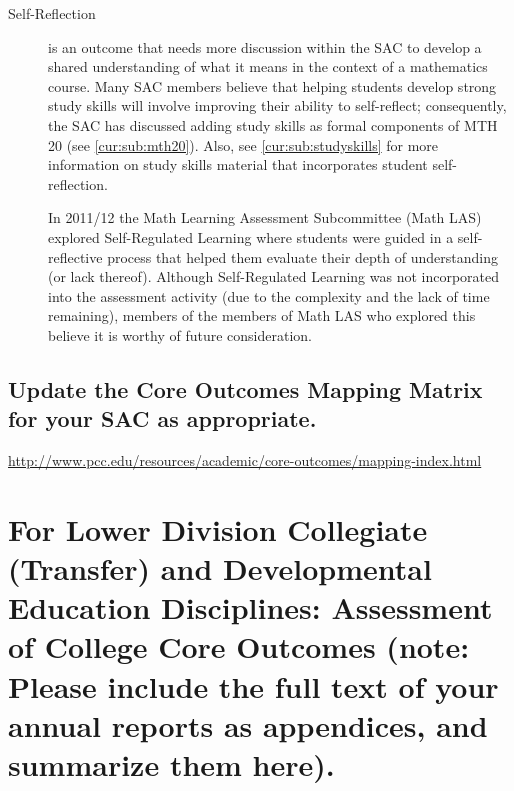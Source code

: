 \begin{description}
\item[Self-Reflection] is an outcome that needs more discussion within the SAC to develop a shared understanding of what it means in the context of a mathematics course.  Many SAC members believe that helping students develop strong study skills will involve improving their ability to self-reflect; consequently, the SAC has discussed adding study skills as formal components of MTH 20 (see \vref{cur:sub:mth20}).  Also,  see \vref{cur:sub:studyskills} for more information on study skills material that incorporates student self-reflection. 

In 2011/12 the Math Learning Assessment Subcommittee (Math LAS) explored Self-Regulated Learning where students were guided in a self-reflective process that helped them evaluate their depth of understanding (or lack thereof).  Although Self-Regulated Learning was not incorporated into the assessment activity (due to the complexity and the lack of time remaining), members of the members of Math LAS who explored this believe it is worthy of future consideration.

\end{description}

\subsection{Update the Core Outcomes Mapping Matrix for your SAC as appropriate.}\url{http://www.pcc.edu/resources/academic/core-outcomes/mapping-index.html} 




\section[Assessment of College Core Outcomes]{For Lower Division Collegiate (Transfer) and Developmental Education Disciplines:  Assessment of College Core Outcomes    (note:  Please include the full text of your annual reports as appendices, and summarize them here).  }\label{ass:sec:coreoutcomes}

